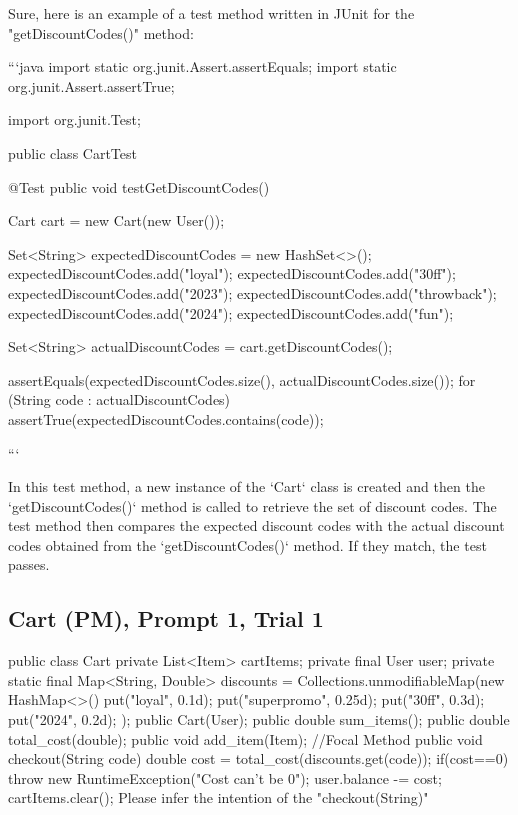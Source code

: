 \begin{response}
Sure, here is an example of a test method written in JUnit for the "getDiscountCodes()" method:

```java
import static org.junit.Assert.assertEquals;
import static org.junit.Assert.assertTrue;

import org.junit.Test;

public class CartTest {

    @Test
    public void testGetDiscountCodes() {
        Cart cart = new Cart(new User());
        
        Set<String> expectedDiscountCodes = new HashSet<>();
        expectedDiscountCodes.add("loyal");
        expectedDiscountCodes.add("30ff");
        expectedDiscountCodes.add("2023");
        expectedDiscountCodes.add("throwback");
        expectedDiscountCodes.add("2024");
        expectedDiscountCodes.add("fun");
        
        Set<String> actualDiscountCodes = cart.getDiscountCodes();
        
        assertEquals(expectedDiscountCodes.size(), actualDiscountCodes.size());
        for (String code : actualDiscountCodes) {
            assertTrue(expectedDiscountCodes.contains(code));
        }
    }
}
```

In this test method, a new instance of the `Cart` class is created and then the `getDiscountCodes()` method is called to retrieve the set of discount codes. The test method then compares the expected discount codes with the actual discount codes obtained from the `getDiscountCodes()` method. If they match, the test passes.  
\end{response}

\subsection{Cart (PM), Prompt 1, Trial 1}

\begin{prompt}
  public class Cart {
    private List<Item> cartItems;
    private final User user;
    private static final Map<String, Double> discounts = Collections.unmodifiableMap(new HashMap<>() {{
        put("loyal", 0.1d);
        put("superpromo", 0.25d);
        put("30ff", 0.3d);
        put("2024", 0.2d);
    }});
    public Cart(User);
    public double sum_items();
    public double total_cost(double);
    public void add_item(Item);
    //Focal Method
    public void checkout(String code) {
        double cost = total_cost(discounts.get(code));
        if(cost==0)
            throw new RuntimeException("Cost can't be 0");
        user.balance -= cost;
        cartItems.clear();
    }
}
Please infer the intention of the "checkout(String)"
\end{prompt}

